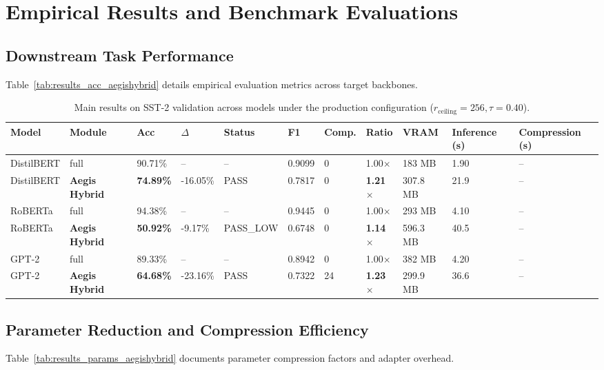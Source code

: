 \section{Empirical Results and Benchmark Evaluations}

\subsection{Downstream Task Performance}
Table~\ref{tab:results_acc_aegishybrid} details empirical evaluation metrics across target backbones.

\begin{table}[t]
\centering
\small
\begin{tabular}{lllllllllll}
\toprule
\textbf{Model} & \textbf{Module} & \textbf{Acc} & \textbf{$\Delta$} & \textbf{Status} & \textbf{F1} & \textbf{Comp.} & \textbf{Ratio} & \textbf{VRAM} & \textbf{Inference (s)} & \textbf{Compression (s)} \\
\midrule
DistilBERT & full & 90.71\% & -- & -- & 0.9099 & 0 & 1.00$\times$ & 183 MB & 1.90 & -- \\
DistilBERT & \textbf{Aegis Hybrid} & \textbf{74.89\%} & -16.05\% & PASS & 0.7817 & 0 & \textbf{1.21$\times$} & 307.8 MB & 21.9 & -- \\
RoBERTa & full & 94.38\% & -- & -- & 0.9445 & 0 & 1.00$\times$ & 293 MB & 4.10 & -- \\
RoBERTa & \textbf{Aegis Hybrid} & \textbf{50.92\%} & -9.17\% & PASS_LOW & 0.6748 & 0 & \textbf{1.14$\times$} & 596.3 MB & 40.5 & -- \\
GPT-2 & full & 89.33\% & -- & -- & 0.8942 & 0 & 1.00$\times$ & 382 MB & 4.20 & -- \\
GPT-2 & \textbf{Aegis Hybrid} & \textbf{64.68\%} & -23.16\% & PASS & 0.7322 & 24 & \textbf{1.23$\times$} & 299.9 MB & 36.6 & -- \\
\bottomrule
\end{tabular}
\caption{Main results on SST-2 validation across models under the production configuration ($r_{\mathrm{ceiling}}=256, \tau=0.40$).}
\label{tab:main_sst2}
\end{table}

\subsection{Parameter Reduction and Compression Efficiency}
Table~\ref{tab:results_params_aegishybrid} documents parameter compression factors and adapter overhead.

